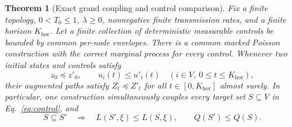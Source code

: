 \documentclass[final,5p,times,twocolumn,sort&compress]{elsarticle}
\theoremstyle{plain}
\newtheorem{theorem}{Theorem}
\begin{document}
\begin{theorem}[Exact grand coupling and control comparison]
\label{thm:coupling}
Fix a finite topology, $0<T_0\le1$, $\lambda\ge0$, nonnegative finite transmission rates, and a finite horizon $K_{\mathrm{hor}}$. Let a finite collection of deterministic measurable controls be bounded by common per-node envelopes. There is a common marked Poisson construction with the correct marginal process for every control. Whenever two initial states and controls satisfy
\begin{equation}
 z_0\preceq z'_0,\qquad u_i(t)\le u'_i(t)
 \quad(i\in V,\ 0\le t\le K_{\mathrm{hor}}),\label{eq:controlorder}
\end{equation}
their augmented paths satisfy $Z_t\preceq Z'_t$ for all $t\in[0,K_{\mathrm{hor}}]$ almost surely. In particular, one construction simultaneously couples every target set $S\subseteq V$ in Eq.~\ref{eq:control}, and
\begin{equation}
 S\subseteq S'\quad\Longrightarrow\quad
 L(S',\xi)\le L(S,\xi),\qquad Q(S')\le Q(S).
 \label{eq:nestedorder}
\end{equation}
\end{theorem}
\end{document}
